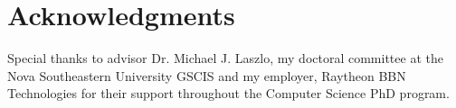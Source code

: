 \documentclass{siam-wns-article}
\begin{document}
\section{Acknowledgments}
Special thanks to advisor Dr. Michael J. Laszlo, my doctoral committee at the Nova Southeastern University GSCIS and my employer, Raytheon BBN Technologies for their support throughout the Computer Science PhD program.



\end{document}
